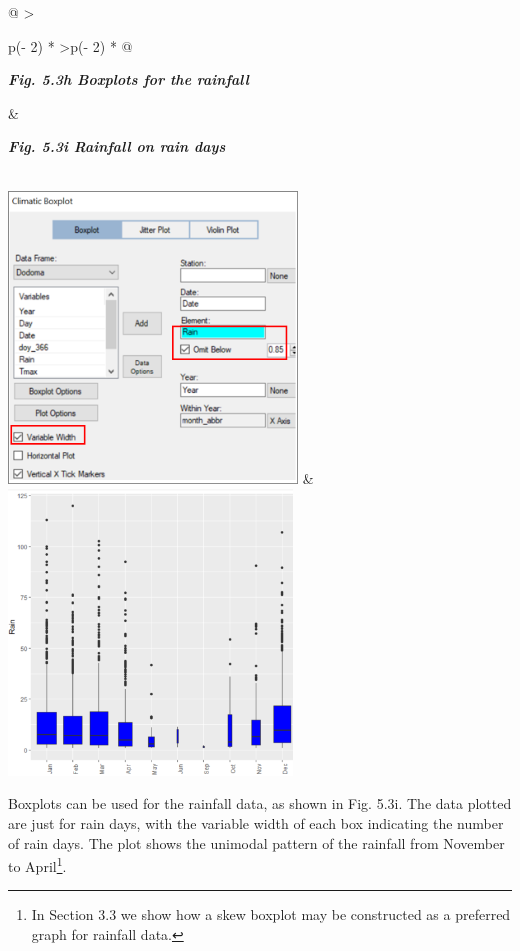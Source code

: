 \documentclass[
  letterpaper,
  DIV=11,
  numbers=noendperiod]{scrreprt}
\begin{document}
\begin{longtable}[]{@{}
  >{\raggedright\arraybackslash}p{(\columnwidth - 2\tabcolsep) * }
  >{\centering\arraybackslash}p{(\columnwidth - 2\tabcolsep) * }@{}}
\toprule\noalign{}
\begin{minipage}[b]{\linewidth}\raggedright
\textbf{\emph{Fig. 5.3h Boxplots for the rainfall}}
\end{minipage} & \begin{minipage}[b]{\linewidth}\centering
\textbf{\emph{Fig. 5.3i Rainfall on rain days}}
\end{minipage} \\
\midrule\noalign{}
\endhead
\bottomrule\noalign{}
\endlastfoot
\includegraphics[width=3.02121in,height=3.05622in]{figures/Fig5.3h.png}
&
\includegraphics[width=2.97219in,height=2.99269in]{figures/Fig5.3i.png} \\
\end{longtable}

Boxplots can be used for the rainfall data, as shown in Fig. 5.3i. The
data plotted are just for rain days, with the variable width of each box
indicating the number of rain days. The plot shows the unimodal pattern
of the rainfall from November to April\footnote{In Section 3.3 we show
  how a skew boxplot may be constructed as a preferred graph for
  rainfall data.}.
\end{document}
